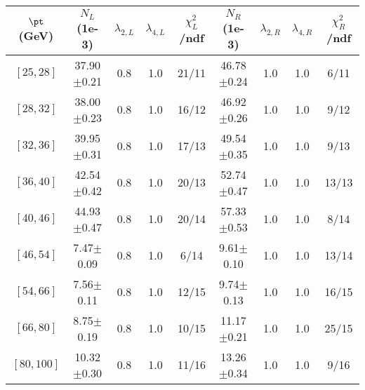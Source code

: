 \begin{tabular}{c||c|c|c|c||c|c|c|c}
$\pt$ (GeV) & $N_L$ (1e-3) & $\lambda_{2,L}$ & $\lambda_{4,L}$  & $\chi^2_L$/ndf & $N_R$ (1e-3) & $\lambda_{2,R}$ & $\lambda_{4,R}$  & $\chi^2_R$/ndf \\
\hline
$[25, 28]$ & 37.90$\pm$0.21 & 0.8 & 1.0 & 21/11 & 46.78$\pm$0.24 & 1.0 & 1.0 & 6/11\\
$[28, 32]$ & 38.00$\pm$0.23 & 0.8 & 1.0 & 16/12 & 46.92$\pm$0.26 & 1.0 & 1.0 & 9/12\\
$[32, 36]$ & 39.95$\pm$0.31 & 0.8 & 1.0 & 17/13 & 49.54$\pm$0.35 & 1.0 & 1.0 & 9/13\\
$[36, 40]$ & 42.54$\pm$0.42 & 0.8 & 1.0 & 20/13 & 52.74$\pm$0.47 & 1.0 & 1.0 & 13/13\\
$[40, 46]$ & 44.93$\pm$0.47 & 0.8 & 1.0 & 20/14 & 57.33$\pm$0.53 & 1.0 & 1.0 & 8/14\\
$[46, 54]$ & 7.47$\pm$0.09 & 0.8 & 1.0 & 6/14 & 9.61$\pm$0.10 & 1.0 & 1.0 & 13/14\\
$[54, 66]$ & 7.56$\pm$0.11 & 0.8 & 1.0 & 12/15 & 9.74$\pm$0.13 & 1.0 & 1.0 & 16/15\\
$[66, 80]$ & 8.75$\pm$0.19 & 0.8 & 1.0 & 10/15 & 11.17$\pm$0.21 & 1.0 & 1.0 & 25/15\\
$[80, 100]$ & 10.32$\pm$0.30 & 0.8 & 1.0 & 11/16 & 13.26$\pm$0.34 & 1.0 & 1.0 & 9/16\\
\end{tabular}
